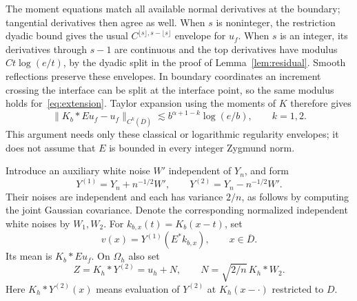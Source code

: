 \documentclass[11pt]{article}
\theoremstyle{remark}
\newcommand{\norm}[1]{\lVert #1\rVert}
\begin{document}
The moment equations match all available normal derivatives at the boundary; tangential derivatives then agree as well. When $s$ is noninteger, the restriction dyadic bound gives the usual $C^{\lfloor s\rfloor,s-\lfloor s\rfloor}$ envelope for $u_f$. When $s$ is an integer, its derivatives through $s-1$ are continuous and the top derivatives have modulus $Ct\log(e/t)$, by the dyadic split in the proof of Lemma~\ref{lem:residual}. Smooth reflections preserve these envelopes. In boundary coordinates an increment crossing the interface can be split at the interface point, so the same modulus holds for~\eqref{eq:extension}. Taylor expansion using the moments of $K$ therefore gives
\begin{equation}\label{eq:pilotbias}
 \norm{K_b*Eu_f-u_f}_{C^k(\overline D)}
 \lesssim b^{\alpha+1-k}\log(e/b),\qquad k=1,2.
\end{equation}
This argument needs only these classical or logarithmic regularity envelopes; it does not assume that $E$ is bounded in every integer Zygmund norm.

Introduce an auxiliary white noise $W'$ independent of $Y_n$, and form
\begin{equation}\label{eq:split}
 Y^{(1)}=Y_n+n^{-1/2}W',\qquad
 Y^{(2)}=Y_n-n^{-1/2}W'.
\end{equation}
Their noises are independent and each has variance $2/n$, as follows by computing the joint Gaussian covariance. Denote the corresponding normalized independent white noises by $W_1,W_2$. For $k_{b,x}(t)=K_b(x-t)$, set
\begin{equation}\label{eq:pilot}
 v(x)=Y^{(1)}(E^*k_{b,x}),\qquad x\in\overline D.
\end{equation}
Its mean is $K_b*Eu_f$. On $\Omega_h$ also set
\begin{equation}\label{eq:Z}
 Z=K_h*Y^{(2)}=u_h+N,\qquad N=\sqrt{2/n}\,K_h*W_2.
\end{equation}
Here $K_h*Y^{(2)}(x)$ means evaluation of $Y^{(2)}$ at $K_h(x-\cdot)$ restricted to $D$.
\end{document}
